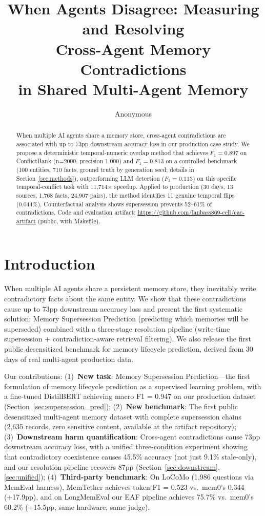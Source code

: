 \documentclass{article}
\title{When Agents Disagree: Measuring and Resolving\\Cross-Agent Memory Contradictions\\in Shared Multi-Agent Memory}
\author{Anonymous}
\date{}
\begin{document}
\maketitle

\begin{abstract}
When multiple AI agents share a memory store, cross-agent contradictions are associated with up to 73pp downstream accuracy loss in our production case study. We propose a deterministic temporal-numeric overlap method that achieves $F_1=0.897$ on ConflictBank (n=2000, precision 1.000) and $F_1=0.813$ on a controlled benchmark (100 entities, 710 facts, ground truth by generation seed; details in Section~\ref{sec:methods}), outperforming LLM detection ($F_1=0.113$) on this specific temporal-conflict task with 11{,}714$\times$ speedup. Applied to production (30 days, 13 sources, 1{,}768 facts, 24{,}907 pairs), the method identifies 11 genuine temporal flips (0.044\%). Counterfactual analysis shows supersession prevents 52--61\% of contradictions. Code and evaluation artifact: \url{https://github.com/lanbass869-cell/cac-artifact} (public, with Makefile).
\end{abstract}

\section{Introduction}
When multiple AI agents share a persistent memory store, they inevitably write contradictory facts about the same entity. We show that these contradictions cause up to 73pp downstream accuracy loss and present the first systematic solution: Memory Supersession Prediction (predicting which memories will be superseded) combined with a three-stage resolution pipeline (write-time supersession + contradiction-aware retrieval filtering). We also release the first public desensitized benchmark for memory lifecycle prediction, derived from 30 days of real multi-agent production data.

Our contributions: (1)~\textbf{New task}: Memory Supersession Prediction---the first formulation of memory lifecycle prediction as a supervised learning problem, with a fine-tuned DistilBERT achieving macro F1 = 0.947 on our production dataset (Section~\ref{sec:supersession_pred}); (2)~\textbf{New benchmark}: The first public desensitized multi-agent memory dataset with complete supersession chains (2{,}635 records, zero sensitive content, available at the artifact repository); (3)~\textbf{Downstream harm quantification}: Cross-agent contradictions cause 73pp downstream accuracy loss, with a unified three-condition experiment showing that contradictory coexistence causes 45.5\% accuracy (not just 9.1\% stale-only), and our resolution pipeline recovers 87pp (Section~\ref{sec:downstream}, \ref{sec:unified}); (4)~\textbf{Third-party benchmark}: On LoCoMo (1{,}986 questions via MemEval harness), MemTether achieves token-F1 = 0.523 vs.\ mem0's 0.344 (+17.9pp), and on LongMemEval our EAF pipeline achieves 75.7\% vs.\ mem0's 60.2\% (+15.5pp, same hardware, same judge).
\end{document}
